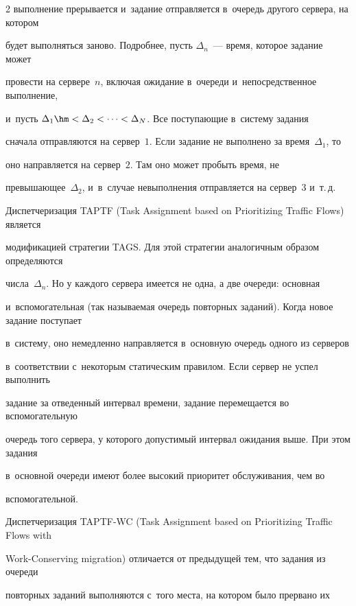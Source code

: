 \begin{multicols}{2}
выполнение прерывается и~задание отправляется в~очередь другого сервера, на котором 


будет выполняться заново. Подробнее, пусть $\Delta_n$~--- время, которое задание может 


провести на сервере~$n$, включая ожидание в~очереди и~непосредственное выполнение, 


и~пусть $\Delta_1\hm< \Delta_2<\cdots < \Delta_N$. Все поступающие в~сис\-те\-му задания 


сначала отправляются на сервер~$1$. Если задание не выполнено за время~$\Delta_1$, то 


оно на\-прав\-ля\-ет\-ся на сервер~$2$. Там оно может пробыть время, не 


превышающее~$\Delta_2$, и~в~случае невыполнения отправляется на сервер~$3$ и~т.\,д.


    


    Диспетчеризация TAPTF (Task Assignment based on Prioritizing Traffic Flows) является 


модификацией стратегии TAGS. Для этой стратегии аналогичным образом определяются 


числа~$\Delta_n$. Но у каждого сервера имеется не одна, а две очереди: основная 


и~вспомогательная (так называемая очередь повторных заданий). Когда новое задание поступает 


в~сис\-те\-му, оно немедленно направляется в~основную очередь одного из серверов 


в~соответствии с~некоторым статическим правилом. Если сервер не успел выполнить 


задание за отведенный интервал времени, задание перемещается во вспомогательную 


очередь того сервера, у которого допустимый интервал ожидания выше. При этом задания 


в~основной очереди имеют более высокий приоритет обслуживания, чем во 


вспомогательной.


    


    Диспетчеризация TAPTF-WC (Task Assignment based on Prioritizing Traffic Flows with 


Work-Conserving migration) отличается от предыдущей тем, что задания из очереди 


повторных заданий выполняются с~того места, на котором было прервано их 



\end{multicols}
